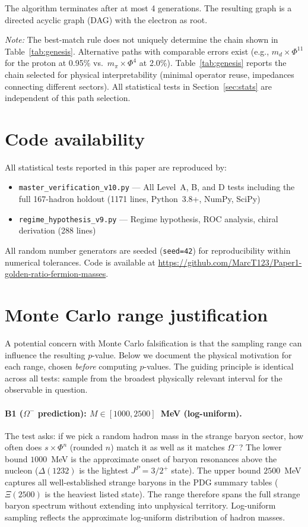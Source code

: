 \documentclass[11pt,a4paper]{article}
\begin{document}
The algorithm terminates after at most 4 generations. The resulting
graph is a directed acyclic graph (DAG) with the electron as root.

\noindent\emph{Note:}
The best-match rule does not uniquely determine the chain shown in
Table~\ref{tab:genesis}. Alternative paths with comparable errors
exist (e.g., $m_d \times \Phi^{11}$ for the proton at 0.95\%
vs.\ $m_\pi \times \Phi^4$ at 2.0\%). Table~\ref{tab:genesis}
reports the chain selected for physical interpretability
(minimal operator reuse, impedances connecting different sectors).
All statistical tests in Section~\ref{sec:stats} are independent
of this path selection.

\section{Code availability}
\label{app:code}

All statistical tests reported in this paper are reproduced by:
\begin{itemize}
  \item \texttt{master\_verification\_v10.py} --- All Level~A, B, and D
        tests including the full 167-hadron holdout (1171 lines, Python~3.8+, NumPy, SciPy)
  \item \texttt{regime\_hypothesis\_v9.py} --- Regime hypothesis, ROC
        analysis, chiral derivation (288 lines)
\end{itemize}
All random number generators are seeded (\texttt{seed=42}) for
reproducibility within numerical tolerances. Code is available at
\url{https://github.com/MarcT123/Paper1-golden-ratio-fermion-masses}.

\section{Monte Carlo range justification}
\label{app:mc_ranges}

A potential concern with Monte Carlo falsification is that the
sampling range can influence the resulting $p$-value. Below we
document the physical motivation for each range, chosen
\emph{before} computing $p$-values. The guiding principle is
identical across all tests: sample from the broadest physically
relevant interval for the observable in question.

\paragraph{B1 ($\Omega^-$ prediction): $M \in [1000, 2500]$~MeV (log-uniform).}
The test asks: if we pick a random hadron mass in the strange baryon
sector, how often does $s \times \Phi^n$ (rounded $n$) match it as well
as it matches $\Omega^-$?
The lower bound $1000$~MeV is the approximate onset of baryon resonances
above the nucleon ($\Delta(1232)$ is the lightest $J^P = 3/2^+$ state).
The upper bound $2500$~MeV captures all well-established strange baryons
in the PDG summary tables ($\Xi(2500)$ is the heaviest listed state).
The range therefore spans the full strange baryon spectrum without
extending into unphysical territory.  Log-uniform sampling reflects the
approximate log-uniform distribution of hadron masses.
\end{document}
